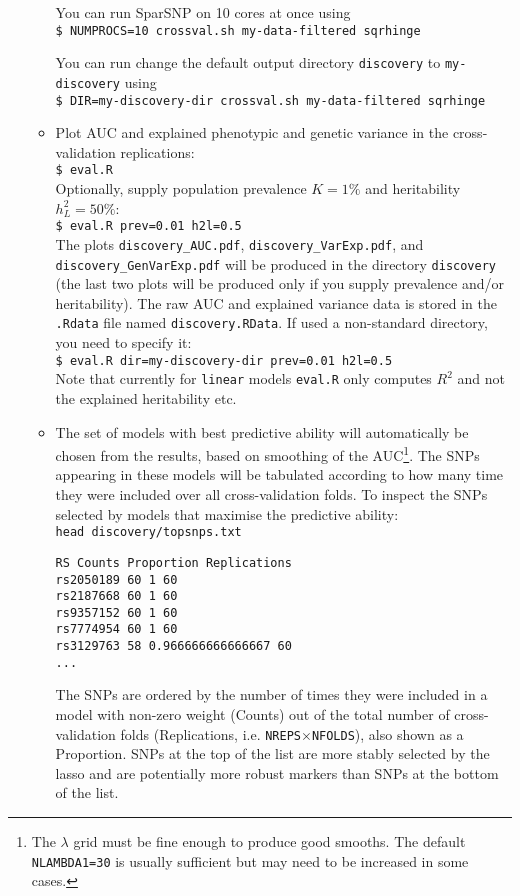 \documentclass[a4paper,11pt]{article}
\begin{document}
\begin{enumerate}
\begin{itemize}
	 You can run SparSNP on 10 cores at once using\\
	 \texttt{\$ NUMPROCS=10 crossval.sh my-data-filtered sqrhinge}

	 You can run change the default output directory \texttt{discovery} to
	 \texttt{my-discovery} using\\
	 \texttt{\$ DIR=my-discovery-dir crossval.sh my-data-filtered sqrhinge}

	 \item Plot AUC and explained phenotypic and genetic variance in the
	 cross-validation replications: \\
	 \texttt{\$ eval.R} \\
	 Optionally, supply population prevalence $K=1\%$ and heritability $h^2_L=50\%$:\\
	 \texttt{\$ eval.R prev=0.01 h2l=0.5} \\
	 The plots \texttt{discovery\_AUC.pdf},
	 \texttt{discovery\_VarExp.pdf}, and \texttt{discovery\_GenVarExp.pdf}
	 will be produced in the directory \texttt{discovery} (the last two
	 plots will be produced only if you supply prevalence and/or
	 heritability).  The raw AUC and
	 explained variance data is stored in the \texttt{.Rdata} file named
	 \texttt{discovery.RData}.  
	 If used a non-standard directory, you need to specify it: \\
	 \texttt{\$ eval.R dir=my-discovery-dir prev=0.01 h2l=0.5} \\
	 Note that currently for \texttt{linear} models \texttt{eval.R} only
	 computes $R^2$ and not the explained heritability etc.

	 \item The set of models with best predictive ability will
	 automatically be chosen from the results, based on smoothing
	 of the AUC\footnote{The $\lambda$ grid must be fine enough
	 to produce good smooths. The default \texttt{NLAMBDA1=30} is usually
	 sufficient but may need to be increased in some cases.}.
	 The SNPs appearing in these models will be
	 tabulated according to how many time they were included over all
	 cross-validation folds. To inspect the SNPs selected by models that
	 maximise the predictive ability:\\
	 \texttt{head discovery/topsnps.txt}
	 \begin{verbatim}
RS Counts Proportion Replications
rs2050189 60 1 60
rs2187668 60 1 60
rs9357152 60 1 60
rs7774954 60 1 60
rs3129763 58 0.966666666666667 60
...
	 \end{verbatim}
	 The SNPs are ordered by the number of times they were included in a
	 model with non-zero weight (Counts) out of the total number of
	 cross-validation folds (Replications, i.e.
	 \texttt{NREPS}$\times$\texttt{NFOLDS}), also shown as a Proportion.
	 SNPs at the top of the list are more stably selected by the lasso and
	 are potentially more robust markers than SNPs at the bottom of the
	 list.


\end{itemize}
\end{enumerate}
\end{document}
